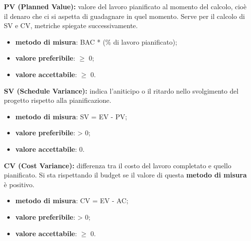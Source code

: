 \textbf{PV (Planned Value):} valore del lavoro pianificato al momento del calcolo, cioè il denaro che ci si aspetta di guadagnare in quel momento.
Serve per il calcolo di SV e CV, metriche spiegate successivamente.
\begin{itemize}
    \item \textbf{metodo di misura}: BAC * (\% di lavoro pianificato);
    \item \textbf{valore preferibile}: $\geq$ 0;
    \item \textbf{valore accettabile}: $\geq$ 0.
\end{itemize}
\textbf{SV (Schedule Variance):} indica l'aniticipo o il ritardo nello svolgimento del progetto rispetto alla pianificazione.
\begin{itemize}
    \item \textbf{metodo di misura}: SV = EV - PV;
    \item \textbf{valore preferibile}: > 0;
    \item \textbf{valore accettabile}: 0.
\end{itemize}
\textbf{CV (Cost Variance):} differenza tra il costo del lavoro completato e quello pianificato. Si sta rispettando il budget se il valore di questa \textbf{metodo di misura} 
è positivo.
\begin{itemize}
    \item \textbf{metodo di misura}: CV = EV - AC;
    \item \textbf{valore preferibile}: > 0;
    \item \textbf{valore accettabile}: $\geq$ 0.
\end{itemize}
